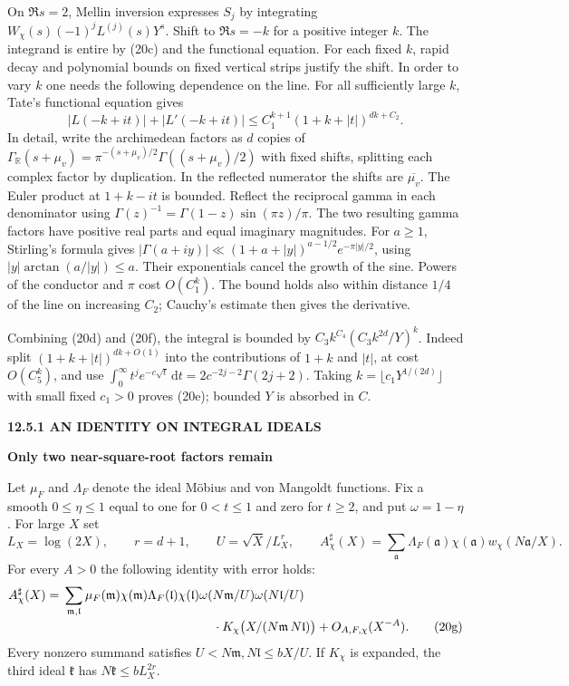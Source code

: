 \documentclass[11pt,letterpaper]{article}
\newcommand{\rightmarktext}{}
\newcommand{\printfolio}{}
\newcommand{\leaf}[4]{\clearpage\gdef\printfolio{#1}\gdef\rightmarktext{#2}%
  {\small\sffamily\bfseries\color{ink}#3\par}\vspace{3pt}%
  {\LARGE\bfseries #4\par}\vspace{5pt}}
\newcommand{\R}{\mathbb R}
\newcommand{\dd}{\,\mathrm d}
\begin{document}
On $\Re s=2$, Mellin inversion expresses $S_j$ by integrating
$W_\chi(s)(-1)^jL^{(j)}(s)Y^s$. Shift to $\Re s=-k$ for a positive
integer $k$. The integrand is entire by (20c) and the functional
equation. For each fixed $k$, rapid decay and polynomial bounds on
fixed vertical strips justify the shift. In order to vary $k$ one
needs the following dependence on the line. For all sufficiently large
$k$, Tate's functional equation gives
\[
      |L(-k+it)|+|L'(-k+it)|
        \le C_1^{k+1}(1+k+|t|)^{dk+C_2}.
 \tag{20f}
\]
In detail, write the archimedean factors as $d$ copies of
$\Gamma_{\R}(s+\mu_v)=\pi^{-(s+\mu_v)/2}\Gamma((s+\mu_v)/2)$
with fixed shifts, splitting each complex factor by duplication.
In the reflected numerator the shifts are $\overline{\mu_v}$.
The Euler product at $1+k-it$ is bounded. Reflect the reciprocal
gamma in each denominator using $\Gamma(z)^{-1}
=\Gamma(1-z)\sin(\pi z)/\pi$. The two resulting gamma factors
have positive real parts and equal imaginary magnitudes.
For $a\ge1$, Stirling's formula gives
$|\Gamma(a+iy)|\ll(1+a+|y|)^{a-1/2}e^{-\pi|y|/2}$,
using $|y|\arctan(a/|y|)\le a$. Their exponentials cancel the
growth of the sine. Powers of the conductor and $\pi$ cost $O(C_1^k)$.
The bound holds also within distance $1/4$ of the line on increasing
$C_2$; Cauchy's estimate then gives the derivative.

Combining (20d) and (20f), the integral is bounded by
$C_3 k^{C_4}(C_3 k^{2d}/Y)^k$. Indeed split
$(1+k+|t|)^{dk+O(1)}$ into the contributions of $1+k$ and $|t|$,
at cost $O(C_5^k)$, and use
$\int_0^\infty t^j e^{-c\sqrt t}\dd t=2c^{-2j-2}\Gamma(2j+2)$.
Taking $k=\lfloor c_1Y^{1/(2d)}\rfloor$ with small fixed $c_1>0$
proves (20e); bounded $Y$ is absorbed in $C$.

\leaf{520e}{Balanced ideal sums}{12.5.1 \quad AN IDENTITY ON INTEGRAL IDEALS}{Only two near-square-root factors remain}
Let $\mu_F$ and $\Lambda_F$ denote the ideal M\"obius and von Mangoldt
functions. Fix a smooth $0\le\eta\le1$ equal to one for $0<t\le1$
and zero for $t\ge2$, and put $\omega=1-\eta$. For large $X$ set
\[
 L_X=\log(2X),\qquad r=d+1,\qquad U=\sqrt X/L_X^r,\qquad
 A^\sharp_\chi(X)=\sum_{\mathfrak a}\Lambda_F(\mathfrak a)
                 \chi(\mathfrak a) w_\chi(N\mathfrak a/X).
\]
For every $A>0$ the following identity with error holds:
\begin{align*}
 A^\sharp_\chi(X)
   ={}&\sum_{\mathfrak m,\mathfrak l}
       \mu_F(\mathfrak m)\chi(\mathfrak m)
       \Lambda_F(\mathfrak l)\chi(\mathfrak l)
       \omega(N\mathfrak m/U)\omega(N\mathfrak l/U)\\[-2pt]
     &\hspace{42mm}\cdot K_\chi\big(X/(N\mathfrak m\,N\mathfrak l)\big)
             +O_{A,F,\chi}(X^{-A}).
 \tag{20g}
 \end{align*}
Every nonzero summand satisfies
$U<N\mathfrak m,N\mathfrak l\le bX/U$. If $K_\chi$ is expanded,
the third ideal $\mathfrak k$ has $N\mathfrak k\le bL_X^{2r}$.
\end{document}
